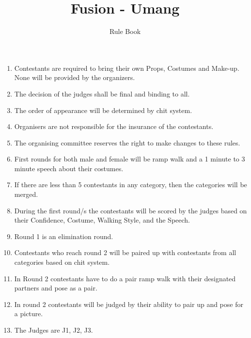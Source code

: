 \documentclass[a4paper, 11pt]{proc}
\begin{document}
\title{Fusion - Umang}
\author{Rule Book}
\maketitle
\begin{enumerate}
	\item Contestants are required to bring their own Props, Costumes and Make-up. None will be provided by the organizers.
	\item The decision of the judges shall be final and binding to all.
	\item The order of appearance will be determined by chit system.
	\item Organisers are not responsible for the insurance of the contestants.
	\item The organising committee reserves the right to make changes to these rules.
	\item First rounds for both male and female will be ramp walk and a 1 minute to 3 minute speech about their costumes.
	\item If there are less than 5 contestants in any category, then the categories will be merged.
	\item During the first round/s the contestants will be scored by the judges based on their Confidence, Costume, Walking Style, and the Speech.
	\item Round 1 is an elimination round.
	\item Contestants who reach round 2 will be paired up with contestants from all categories based on chit system.
	\item In Round 2 contestants have to do a pair ramp walk with their designated partners and pose as a pair.
	\item In round 2 contestants will be judged by their ability to pair up and pose for a picture.
	\item The Judges are J1, J2, J3.
\end{enumerate}
\end{document}
